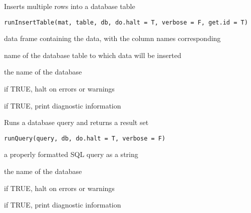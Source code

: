 \documentclass[letterpaper]{book}
\begin{document}
%
\begin{Description}\relax
Inserts multiple rows into a database table
\end{Description}
%
\begin{Usage}
\begin{verbatim}
runInsertTable(mat, table, db, do.halt = T, verbose = F, get.id = T)
\end{verbatim}
\end{Usage}
%
\begin{Arguments}
\begin{ldescription}
\item[\code{mat}] data frame containing the data, with the column names corresponding

\item[\code{table}] name of the database table to which data will be inserted

\item[\code{db}] the name of the database

\item[\code{do.halt}] if TRUE, halt on errors or warnings

\item[\code{verbose}] if TRUE, print diagnostic information
\end{ldescription}
\end{Arguments}
%
\begin{Description}\relax
Runs a database query and returns a result set
\end{Description}
%
\begin{Usage}
\begin{verbatim}
runQuery(query, db, do.halt = T, verbose = F)
\end{verbatim}
\end{Usage}
%
\begin{Arguments}
\begin{ldescription}
\item[\code{query}] a properly formatted SQL query as a string

\item[\code{db}] the name of the database

\item[\code{do.halt}] if TRUE, halt on errors or warnings

\item[\code{verbose}] if TRUE, print diagnostic information
\end{ldescription}
\end{Arguments}
\end{document}
